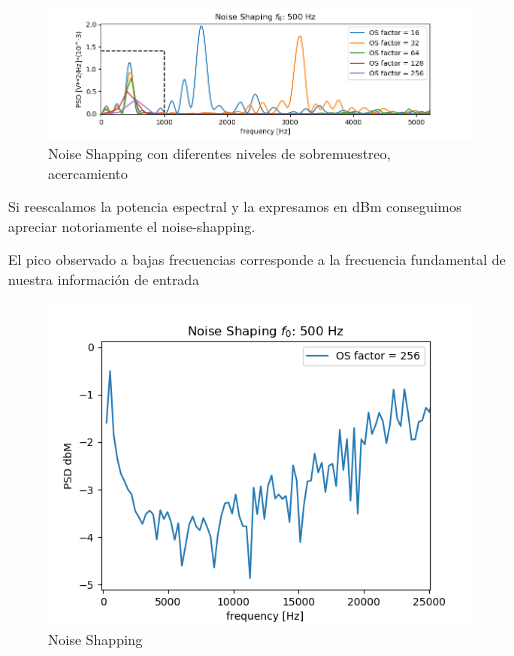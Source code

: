 \begin{figure}[H]
	\centering
	\includegraphics[width=\linewidth]{ImagenesEjercicio2/NoiseShappingSolidZoom.png}
	\caption{Noise Shapping con diferentes niveles de sobremuestreo, acercamiento}
	\label{fig:noiseshappingdemo1}
\end{figure}

Si reescalamos la potencia espectral y la expresamos en dBm conseguimos apreciar notoriamente el noise-shapping.

El pico observado a bajas frecuencias corresponde a la frecuencia fundamental de nuestra información de entrada
\begin{figure}[H]
	\centering
	\includegraphics[scale=0.7]{ImagenesEjercicio2/NoiseShappingdbM.png}
	\caption{Noise Shapping}
	\label{fig:noiseshappingdemo1}
\end{figure}

